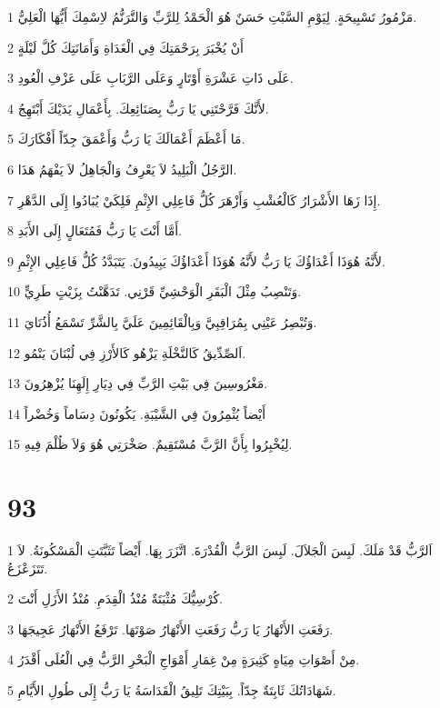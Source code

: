 \par 1 مَزْمُورُ تَسْبِيحَةٍ. لِيَوْمِ السَّبْتِ حَسَنٌ هُوَ الْحَمْدُ لِلرَّبِّ وَالتَّرَنُّمُ لاِسْمِكَ أَيُّهَا الْعَلِيُّ.
\par 2 أَنْ يُخْبَرَ بِرَحْمَتِكَ فِي الْغَدَاةِ وَأَمَانَتِكَ كُلَّ لَيْلَةٍ
\par 3 عَلَى ذَاتِ عَشْرَةِ أَوْتَارٍ وَعَلَى الرَّبَابِ عَلَى عَزْفِ الْعُودِ.
\par 4 لأَنَّكَ فَرَّحْتَنِي يَا رَبُّ بِصَنَائِعِكَ. بِأَعْمَالِ يَدَيْكَ أَبْتَهِجُ.
\par 5 مَا أَعْظَمَ أَعْمَالَكَ يَا رَبُّ وَأَعْمَقَ جِدّاً أَفْكَارَكَ.
\par 6 الرَّجُلُ الْبَلِيدُ لاَ يَعْرِفُ وَالْجَاهِلُ لاَ يَفْهَمُ هَذَا.
\par 7 إِذَا زَهَا الأَشْرَارُ كَالْعُشْبِ وَأَزْهَرَ كُلُّ فَاعِلِي الإِثْمِ فَلِكَيْ يُبَادُوا إِلَى الدَّهْرِ.
\par 8 أَمَّا أَنْتَ يَا رَبُّ فَمُتَعَالٍ إِلَى الأَبَدِ.
\par 9 لأَنَّهُ هُوَذَا أَعْدَاؤُكَ يَا رَبُّ لأَنَّهُ هُوَذَا أَعْدَاؤُكَ يَبِيدُونَ. يَتَبَدَّدُ كُلُّ فَاعِلِي الإِثْمِ.
\par 10 وَتَنْصِبُ مِثْلَ الْبَقَرِ الْوَحْشِيِّ قَرْنِي. تَدَهَّنْتُ بِزَيْتٍ طَرِيٍّ.
\par 11 وَتُبْصِرُ عَيْنِي بِمُرَاقِبِيَّ وَبِالْقَائِمِينَ عَلَيَّ بِالشَّرِّ تَسْمَعُ أُذُنَايَ.
\par 12 اَلصِّدِّيقُ كَالنَّخْلَةِ يَزْهُو كَالأَرْزِ فِي لُبْنَانَ يَنْمُو.
\par 13 مَغْرُوسِينَ فِي بَيْتِ الرَّبِّ فِي دِيَارِ إِلَهِنَا يُزْهِرُونَ.
\par 14 أَيْضاً يُثْمِرُونَ فِي الشَّيْبَةِ. يَكُونُونَ دِسَاماً وَخُضْراً
\par 15 لِيُخْبِرُوا بِأَنَّ الرَّبَّ مُسْتَقِيمٌ. صَخْرَتِي هُوَ وَلاَ ظُلْمَ فِيهِ.

\chapter{93}

\par 1 اَلرَّبُّ قَدْ مَلَكَ. لَبِسَ الْجَلاَلَ. لَبِسَ الرَّبُّ الْقُدْرَةَ. اتَّزَرَ بِهَا. أَيْضاً تَثَبَّتَتِ الْمَسْكُونَةُ. لاَ تَتَزَعْزَعُ.
\par 2 كُرْسِيُّكَ مُثْبَتَةٌ مُنْذُ الْقِدَمِ. مُنْذُ الأَزَلِ أَنْتَ.
\par 3 رَفَعَتِ الأَنْهَارُ يَا رَبُّ رَفَعَتِ الأَنْهَارُ صَوْتَهَا. تَرْفَعُ الأَنْهَارُ عَجِيجَهَا.
\par 4 مِنْ أَصْوَاتِ مِيَاهٍ كَثِيرَةٍ مِنْ غِمَارِ أَمْوَاجِ الْبَحْرِ الرَّبُّ فِي الْعُلَى أَقْدَرُ.
\par 5 شَهَادَاتُكَ ثَابِتَةٌ جِدّاً. بِبَيْتِكَ تَلِيقُ الْقَدَاسَةُ يَا رَبُّ إِلَى طُولِ الأَيَّامِ.

